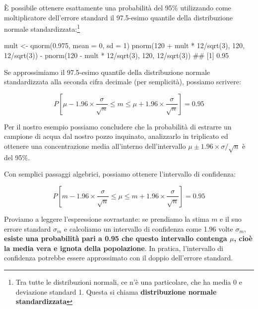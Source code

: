 \documentclass[a4paper,12pt,oneside]{book}
\newenvironment{Shaded}{\begin{snugshade}}{\end{snugshade}}
\newcommand{\DecValTok}[1]{#1}
\newcommand{\FloatTok}[1]{#1}
\newcommand{\SpecialCharTok}[1]{#1}
\newcommand{\DocumentationTok}[1]{#1}
\newcommand{\OtherTok}[1]{#1}
\newcommand{\FunctionTok}[1]{#1}
\newcommand{\AttributeTok}[1]{#1}
\newcommand{\NormalTok}[1]{#1}
\begin{document}
È possibile ottenere esattamente una probabilità del 95\% utilizzando come moltiplicatore dell'errore standard il 97.5-esimo quantile della distribuzione normale standardizzata:\footnote{Tra tutte le distribuzioni normali, ce n'è una particolare, che ha media 0 e deviazione standard 1. Questa si chiama \textbf{distribuzione normale standardizzata}}

\begin{Shaded}
\begin{Highlighting}[]
\NormalTok{mult }\OtherTok{\textless{}{-}} \FunctionTok{qnorm}\NormalTok{(}\FloatTok{0.975}\NormalTok{, }\AttributeTok{mean =} \DecValTok{0}\NormalTok{, }\AttributeTok{sd =} \DecValTok{1}\NormalTok{)}
\FunctionTok{pnorm}\NormalTok{(}\DecValTok{120} \SpecialCharTok{+}\NormalTok{ mult }\SpecialCharTok{*} \DecValTok{12}\SpecialCharTok{/}\FunctionTok{sqrt}\NormalTok{(}\DecValTok{3}\NormalTok{), }\DecValTok{120}\NormalTok{, }\DecValTok{12}\SpecialCharTok{/}\FunctionTok{sqrt}\NormalTok{(}\DecValTok{3}\NormalTok{)) }\SpecialCharTok{{-}} 
  \FunctionTok{pnorm}\NormalTok{(}\DecValTok{120} \SpecialCharTok{{-}}\NormalTok{ mult }\SpecialCharTok{*} \DecValTok{12}\SpecialCharTok{/}\FunctionTok{sqrt}\NormalTok{(}\DecValTok{3}\NormalTok{), }\DecValTok{120}\NormalTok{, }\DecValTok{12}\SpecialCharTok{/}\FunctionTok{sqrt}\NormalTok{(}\DecValTok{3}\NormalTok{))}
\DocumentationTok{\#\# [1] 0.95}
\end{Highlighting}
\end{Shaded}

Se approssimiamo il 97.5-esimo quantile della distribuzione normale standardizzata alla seconda cifra decimale (per semplicità), possiamo scrivere:

\[ P \left[ \mu - 1.96 \times \frac{\sigma}{\sqrt{n} } \leq m \leq \mu + 1.96 \times \frac{\sigma}{\sqrt{n} } \right] = 0.95 \]

Per il nostro esempio possiamo concludere che la probabilità di estrarre un campione di acqua dal nostro pozzo inquinato, analizzarlo in triplicato ed ottenere una concentrazione media all'interno dell'intervallo \(\mu \pm 1.96 \times\sigma/\sqrt{n}\) è del 95\%.

Con semplici passaggi algebrici, possiamo ottenere l'intervallo di confidenza:

\[ P \left[ m - 1.96 \times \frac{\sigma}{\sqrt{n} } \leq \mu \leq m + 1.96 \times \frac{\sigma}{\sqrt{n} } \right] = 0.95 \]

Proviamo a leggere l'espressione sovrastante: se prendiamo la stima \(m\) e il suo errore standard \(\sigma_m\) e calcoliamo un intervallo di confidenza come 1.96 volte \(\sigma_m\), \textbf{esiste una probabilità pari a 0.95 che questo intervallo contenga \(\mu\), cioè la media vera e ignota della popolazione}. In pratica, l'intervallo di confidenza potrebbe essere approssimato con il doppio dell'errore standard.
\end{document}

